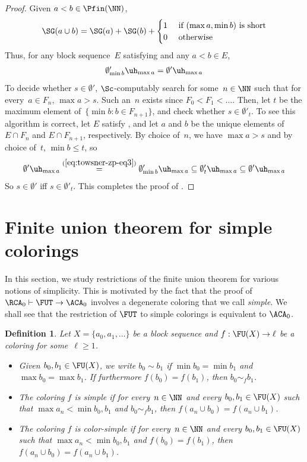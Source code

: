 \documentclass{article}
\numberwithin{theorem}{section}
\newtheorem{definition}[theorem]{Definition}
\begin{document}
\begin{proof}
\noindent
Given $a < b \in \Pfin(\NN)$, 
$$
\SG(a \cup b) = \SG(a) + \SG(b) + \begin{cases}
    1 & \text{ if $(\max a, \min b)$ is short}\\
    0 & \text{ otherwise}
\end{cases}
$$
Thus, for any block sequence~$E$ satisfying  and any $a < b \in E$,
\begin{align}\label{eq:towsner-zp-eq3}
\emptyset'_{\min b} \uh_{\max a} = \emptyset' \uh_{\max a}
\end{align}
To decide whether $s \in \emptyset'$, $\Sc$-computably search for some~$n \in \NN$ such that for every~$a \in F_n$, $\max a > s$. Such an~$n$ exists since $F_0 < F_1 < \dots$.
Then, let $t$ be the maximum element of~$\{ \min b : b \in F_{n+1} \}$, and check whether $s \in \emptyset'_t$.
To see this algorithm is correct, let $E$ satisfy , and let $a$ and $b$ be the unique elements of $E \cap F_n$ and $E \cap F_{n+1}$, respectively. By choice of~$n$, we have $\max a > s$ and by choice of~$t$, $\min b \leq t$, so
$$
\emptyset' \uh_{\max a} \overset{(\ref{eq:towsner-zp-eq3})}=  \emptyset'_{\min b} \uh_{\max a}  \subseteq  \emptyset'_t \uh_{\max a} \subseteq  \emptyset' \uh_{\max a}
$$
So $s \in \emptyset'$ iff $s \in \emptyset'_t$. This completes the proof of .
\end{proof}

\section{Finite union theorem for simple colorings}

In this section, we study restrictions of the finite union theorem for various notions of simplicity.
This is motivated by the fact that the proof of $\RCA_0 \vdash \FUT \to \ACA_0$ involves a degenerate coloring that we call \emph{simple}. We shall see that the restriction of $\FUT$ to simple colorings is equivalent to $\ACA_0$.

\begin{definition}
Let $X = \{ a_0, a_1, \dots \}$ be a block sequence and $f : \FU(X) \to \ell$ be a coloring for some~$\ell \geq 1$.
\begin{itemize}
    \item Given $b_0, b_1 \in \FU(X)$, we write $b_0 \sim b_1$ if $\min b_0 = \min b_1$ and $\max b_0 = \max b_1$. If furthermore $f(b_0) = f(b_1)$, then $b_0 \sim_f b_1$.
    \item The coloring $f$ is \emph{simple} if for every~$n \in \NN$ and every $b_0, b_1 \in \FU(X)$ such that $\max a_n < \min b_0, b_1$ and $b_0 \sim_f b_1$, then $f(a_n \cup b_0) = f(a_n \cup b_1)$.
    \item The coloring $f$ is \emph{color-simple} if for every~$n \in \NN$ and every $b_0, b_1 \in \FU(X)$ such that $\max a_n < \min b_0, b_1$ and $f(b_0) = f(b_1)$, then $f(a_n \cup b_0) = f(a_n \cup b_1)$.
\end{itemize}
\end{definition}
\end{document}
